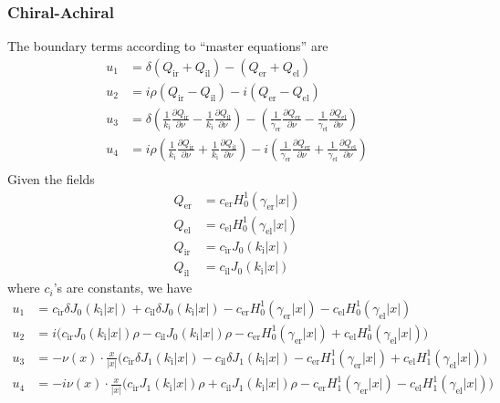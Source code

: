 \subsubsection{Chiral-Achiral}

The boundary terms according to ``master equations'' are
\begin{align*}
  u_1 &= \delta(Q_\text{ir} + Q_\text{il}) - (Q_\text{er} + Q_\text{el})\\
  u_2 &= i\rho(Q_\text{ir} - Q_\text{il}) -i(Q_\text{er} - Q_\text{el}) \\
  u_3 &=\delta\left(\frac{1}{k_\text{i}}\frac{\partial Q_\text{ir}}{\partial\nu} - \frac{1}{k_\text{i}}\frac{\partial Q_\text{il}}{\partial\nu}\right) -\left(\frac{1}{\gamma_\text{er}}\frac{\partial Q_\text{er}}{\partial\nu} - \frac{1}{\gamma_\text{el}}\frac{\partial Q_\text{el}}{\partial\nu}\right) \\
  u_4 &=i\rho\left(\frac{1}{k_\text{i}}\frac{\partial Q_\text{ir}}{\partial\nu} + \frac{1}{k_\text{i}}\frac{\partial Q_\text{il}}{\partial\nu}\right) -i\left(\frac{1}{\gamma_\text{er}}\frac{\partial Q_\text{er}}{\partial\nu} + \frac{1}{\gamma_\text{el}}\frac{\partial Q_\text{el}}{\partial\nu}\right) \\
\end{align*}
Given the fields
\begin{align*}
  Q_\text{er} &= c_\text{er}H_0^1(\gamma_\text{er}|x|) \\
  Q_\text{el} &= c_\text{el}H_0^1(\gamma_\text{el}|x|) \\
  Q_\text{ir} &= c_\text{ir}J_0(k_\text{i}|x|) \\
  Q_\text{il} &= c_\text{il}J_0(k_\text{i}|x|)
\end{align*}
where $c_i$'s are constants, we have
\begin{align*}
  u_1 &= c_\text{ir} \delta J_0(k_\text{i}|x|)+c_\text{il} \delta J_0(k_\text{i}|x|)-c_\text{er} H_0^1(\gamma_\text{er}|x|)-c_\text{el} H_0^1(\gamma_\text{el}|x|) \\
  u_2 &= i \bigl(c_\text{ir} J_0(k_\text{i}|x|) \rho-c_\text{il} J_0(k_\text{i}|x|) \rho-c_\text{er} H_0^1(\gamma_\text{er}|x|)+c_\text{el} H_0^1(\gamma_\text{el}|x|)\bigr)\\
  u_3 &= -\nu(x)\cdot\frac{x}{|x|} \bigl(c_\text{ir} \delta J_1(k_\text{i}|x|)-c_\text{il} \delta J_1(k_\text{i}|x|)-c_\text{er} H_1^1(\gamma_\text{er}|x|)+c_\text{el} H_1^1(\gamma_\text{el}|x|)\bigr)\\
  u_4 &= -i \nu(x)\cdot\frac{x}{|x|} \bigl(c_\text{ir} J_1(k_\text{i}|x|) \rho+c_\text{il} J_1(k_\text{i}|x|) \rho-c_\text{er} H_1^1(\gamma_\text{er}|x|)-c_\text{el} H_1^1(\gamma_\text{el}|x|)\bigr) \\
\end{align*}

